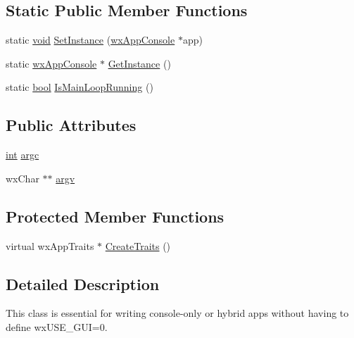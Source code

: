 \subsection*{Static Public Member Functions}
\begin{DoxyCompactItemize}
\item 
static \hyperlink{sound_8c_ae35f5844602719cf66324f4de2a658b3}{void} \hyperlink{classwx_app_console_a7ca751aa37cd3f920e20d9d967ad413d}{Set\+Instance} (\hyperlink{classwx_app_console}{wx\+App\+Console} $\ast$app)
\item 
static \hyperlink{classwx_app_console}{wx\+App\+Console} $\ast$ \hyperlink{classwx_app_console_a2cb953d248e41fd5bdb95ade98311ad3}{Get\+Instance} ()
\item 
static \hyperlink{mac_2config_2i386_2lib-src_2libsoxr_2soxr-config_8h_abb452686968e48b67397da5f97445f5b}{bool} \hyperlink{classwx_app_console_abe34922edd0a98a63de3cc73e95fda35}{Is\+Main\+Loop\+Running} ()
\end{DoxyCompactItemize}
\subsection*{Public Attributes}
\begin{DoxyCompactItemize}
\item 
\hyperlink{xmltok_8h_a5a0d4a5641ce434f1d23533f2b2e6653}{int} \hyperlink{classwx_app_console_a18d2288273cee260ff047831a5e8bfc5}{argc}
\item 
wx\+Char $\ast$$\ast$ \hyperlink{classwx_app_console_aec036ffd2b28e72ca36cb0f7ef6a3b37}{argv}
\end{DoxyCompactItemize}
\subsection*{Protected Member Functions}
\begin{DoxyCompactItemize}
\item 
virtual wx\+App\+Traits $\ast$ \hyperlink{classwx_app_console_ab2811644bfee7a93d0564a09397c4408}{Create\+Traits} ()
\end{DoxyCompactItemize}


\subsection{Detailed Description}
This class is essential for writing console-\/only or hybrid apps without having to define {\ttfamily wx\+U\+S\+E\+\_\+\+G\+UI=0}.

